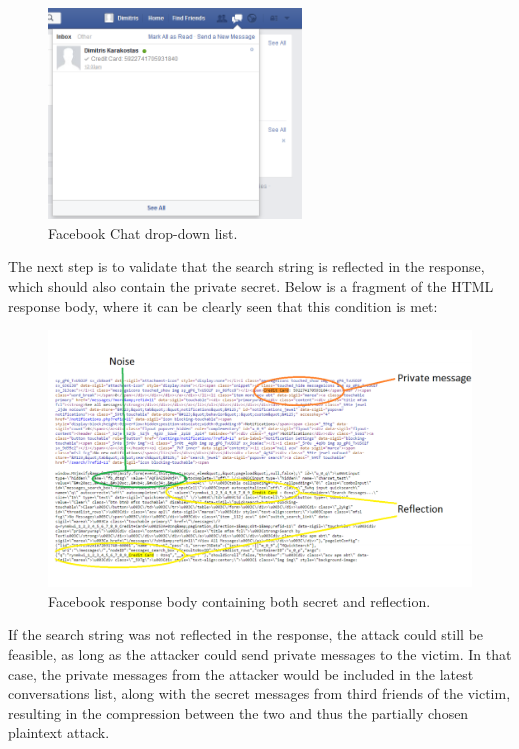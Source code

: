 \begin{figure}[H] \caption{Facebook Chat drop-down list.} \centering
\includegraphics[width=0.6\textwidth]{diagrams/fb_message.png}\end{figure}

The next step is to validate that the search string is reflected in the
response, which should also contain the private secret. Below is a fragment of
the HTML response body, where it can be clearly seen that this condition is met:

\begin{figure}[H] \caption{Facebook response body containing both secret and
reflection.} \centering
\includegraphics[width=1.1\textwidth]{diagrams/fb_response.png}\end{figure}

If the search string was not reflected in the response, the attack could still
be feasible, as long as the attacker could send private messages to the victim.
In that case, the private messages from the attacker would be included in the
latest conversations list, along with the secret messages from third friends of
the victim, resulting in the compression between the two and thus the partially
chosen plaintext attack.

